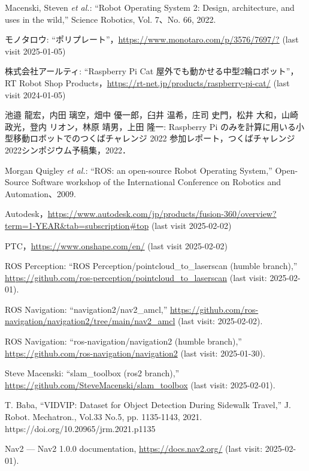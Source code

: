\documentclass[twocolumn,9pt]{jsproceedings}
\begin{document}
\footnotesize
\begin{thebibliography}{99}

  Macenski, Steven {\it et al.}: ``Robot Operating System 2: Design, architecture, and uses in the wild,''
  Science Robotics, Vol. 7、No. 66, 2022.

  モノタロウ: ``ポリプレート''，\url{https://www.monotaro.com/p/3576/7697/?} (last visit 2025-01-05)

  株式会社アールティ: ``Raspberry Pi Cat 屋外でも動かせる中型2輪ロボット''，
  RT Robot Shop Products，\url{https://rt-net.jp/products/raspberry-pi-cat/} (last visit 2024-01-05)

  池邉 龍宏，内田 璃空，畑中 優一郎，臼井 温希，庄司 史門，松井 大和，山崎 政光，登内 リオン，林原 靖男，上田 隆一: Raspberry Pi のみを計算に用いる小型移動ロボットでのつくばチャレンジ 2022 参加レポート，つくばチャレンジ2022シンポジウム予稿集，2022．

  Morgan Quigley {\it et al.}: ``ROS: an open-source Robot Operating System,''
  Open-Source Software workshop of the International Conference on Robotics and Automation、2009.

  Autodesk，\url{https://www.autodesk.com/jp/products/fusion-360/overview?term=1-YEAR&tab=subscription#top} (last visit 2025-02-02)

  PTC，\url{https://www.onshape.com/en/} (last visit 2025-02-02)

  ROS Perception: ``ROS Perception/pointcloud\_to\_laserscan (humble branch),'' \url{https://github.com/ros-perception/pointcloud_to_laserscan} (last visit: 2025-02-01).

  ROS Navigation: ``navigation2/nav2\_amcl,'' \url{https://github.com/ros-navigation/navigation2/tree/main/nav2_amcl}  (last visit: 2025-02-02).

  ROS Navigation: ``ros-navigation/navigation2 (humble branch),'' \url{https://github.com/ros-navigation/navigation2} (last visit: 2025-01-30).

  Steve Macenski: ``slam\_toolbox (ros2 branch),'' \url{https://github.com/SteveMacenski/slam_toolbox} (last visit: 2025-02-01).

  T. Baba, “VIDVIP: Dataset for Object Detection During Sidewalk Travel,” J. Robot. Mechatron., Vol.33 No.5, pp. 1135-1143, 2021. https://doi.org/10.20965/jrm.2021.p1135
  
  Nav2 — Nav2 1.0.0 documentation, \url{https://docs.nav2.org/} (last visit: 2025-02-01).
\end{thebibliography}
\normalsize

\clearpage
\end{document}
